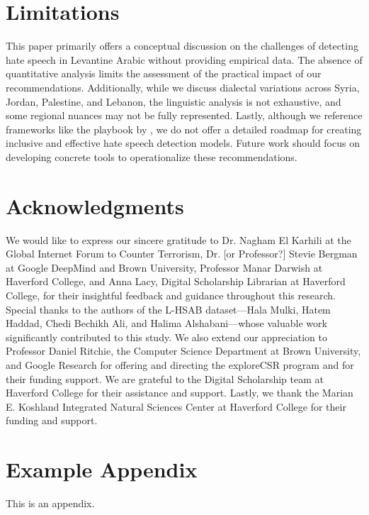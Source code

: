 \documentclass[11pt]{article}
\begin{document}
\section{Limitations}

This paper primarily offers a conceptual discussion on the challenges of detecting hate speech in Levantine Arabic without providing empirical data. The absence of quantitative analysis limits the assessment of the practical impact of our recommendations. Additionally, while we discuss dialectal variations across Syria, Jordan, Palestine, and Lebanon, the linguistic analysis is not exhaustive, and some regional nuances may not be fully represented. Lastly, although we reference frameworks like the playbook by \citet{bergman2022responsiblenaturallanguageannotation}, we do not offer a detailed roadmap for creating inclusive and effective hate speech detection models. Future work should focus on developing concrete tools to operationalize these recommendations.




\section*{Acknowledgments}

We would like to express our sincere gratitude to Dr. Nagham El Karhili at the Global Internet Forum to Counter Terrorism, Dr. [or Professor?] Stevie Bergman at Google DeepMind and Brown University, Professor Manar Darwish at Haverford College, and Anna Lacy, Digital Scholarship Librarian at Haverford College, for their insightful feedback and guidance throughout this research. Special thanks to the authors of the L-HSAB dataset—Hala Mulki, Hatem Haddad, Chedi Bechikh Ali, and Halima Alshabani—whose valuable work significantly contributed to this study. We also extend our appreciation to Professor Daniel Ritchie, the Computer Science Department at Brown University, and Google Research for offering and directing the exploreCSR program and for their funding support. We are grateful to the Digital Scholarship team at Haverford College for their assistance and support. Lastly, we thank the Marian E. Koshland Integrated Natural Sciences Center at Haverford College for their funding and support.



%


\appendix

\section{Example Appendix}
\label{sec:appendix}

This is an appendix.
\end{document}
